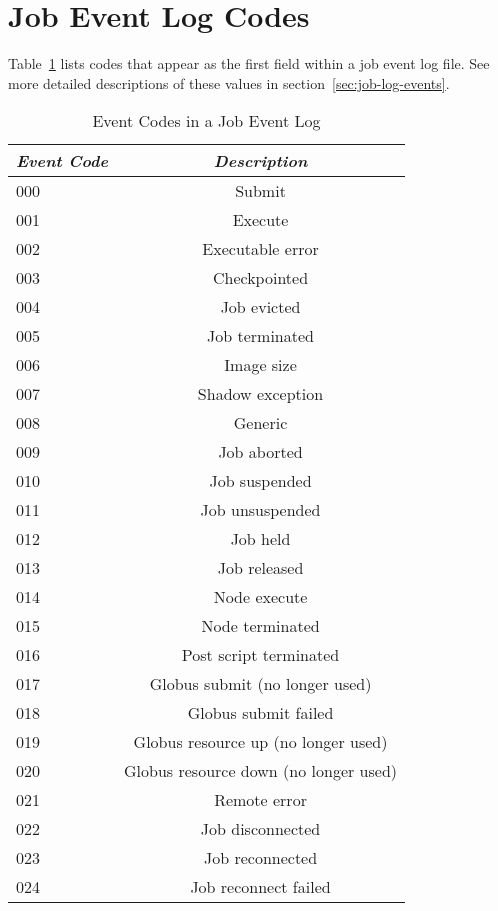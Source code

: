 \section{Job Event Log Codes}
Table~\ref{table:user-log-event-codes} lists codes that appear as 
the first field within a job event log file.
See more detailed descriptions of these values in
section~\ref{sec:job-log-events}.
\begin{table}[ht]
\centering
\caption{\label{table:user-log-event-codes}Event Codes in a Job Event Log}
\begin{tabular}{|l|c|} \hline
\emph{Event Code} & \emph{Description}   \\ \hline \hline
000   &   Submit  \\ \hline
001   &   Execute  \\ \hline
002   &   Executable error  \\ \hline
003   &   Checkpointed  \\ \hline
004   &   Job evicted  \\ \hline
005   &   Job terminated  \\ \hline
006   &   Image size  \\ \hline
007   &   Shadow exception  \\ \hline
008   &   Generic  \\ \hline
009   &   Job aborted  \\ \hline
010   &   Job suspended  \\ \hline
011   &   Job unsuspended  \\ \hline
012   &   Job held  \\ \hline
013   &   Job released  \\ \hline
014   &   Node execute  \\ \hline
015   &   Node terminated  \\ \hline
016   &   Post script terminated  \\ \hline
017   &   Globus submit (no longer used)  \\ \hline
018   &   Globus submit failed  \\ \hline
019   &   Globus resource up (no longer used)  \\ \hline
020   &   Globus resource down (no longer used)  \\ \hline
021   &   Remote error  \\ \hline
022   &   Job disconnected  \\ \hline
023   &   Job reconnected  \\ \hline
024   &   Job reconnect failed  \\ \hline

\end{tabular}
\end{table}
